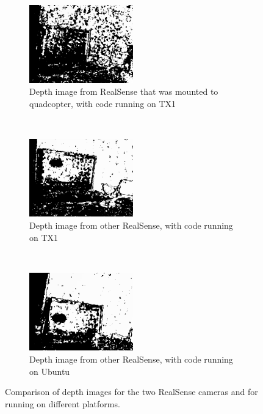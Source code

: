 \documentclass[12pt,a4paper]{article}
\begin{document}
\begin{figure}[t!]
  \centering
  \begin{subfigure}[t]{0.3\textwidth}
  \centering
    \includegraphics[width=45mm]{camera_tests/quad_camera_TX1}
  \caption{Depth image from RealSense that was mounted to quadcopter, with code running on TX1}
  \end{subfigure} %
  ~
  \begin{subfigure}[t]{0.3\textwidth}
  \centering
    \includegraphics[width=45mm]{camera_tests/other_camera_TX1}
  \caption{Depth image from other RealSense, with code running on TX1}
  \end{subfigure}%
  ~
  \begin{subfigure}[t]{0.3\textwidth}
  \centering
    \includegraphics[width=45mm]{camera_tests/other_camera_ubuntu}
  \caption{Depth image from other RealSense, with code running on Ubuntu}
  \end{subfigure}
  \caption{Comparison of depth images for the two RealSense cameras and for running on different platforms.}
\end{figure}
\end{document}
